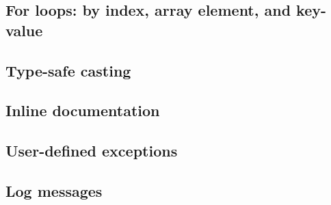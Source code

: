 \documentclass{article}
\theoremstyle{definition}
\begin{document}
\subsection{For loops: by index, array element, and key-value}


\subsection{Type-safe casting}


\subsection{Inline documentation}


\subsection{User-defined exceptions}


\subsection{Log messages}

\end{document}
